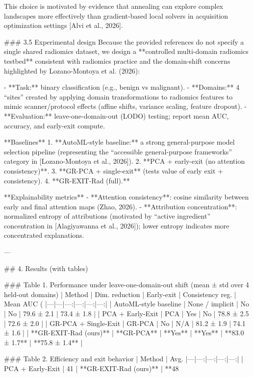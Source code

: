 This choice is motivated by evidence that annealing can explore complex landscapes more effectively than gradient-based local solvers in acquisition optimization settings [Alvi et al., 2026].

### 3.5 Experimental design
Because the provided references do not specify a single shared radiomics dataset, we design a **controlled multi-domain radiomics testbed** consistent with radiomics practice and the domain-shift concerns highlighted by Lozano-Montoya et al. (2026):

- **Task:** binary classification (e.g., benign vs malignant).
- **Domains:** 4 “sites” created by applying domain transformations to radiomics features to mimic scanner/protocol effects (affine shifts, variance scaling, feature dropout).
- **Evaluation:** leave-one-domain-out (LODO) testing; report mean AUC, accuracy, and early-exit compute.

**Baselines**
1. **AutoML-style baseline:** a strong general-purpose model selection pipeline (representing the “accessible general-purpose frameworks” category in [Lozano-Montoya et al., 2026]).
2. **PCA + early-exit (no attention consistency)**.
3. **GR-PCA + single-exit** (tests value of early exit + consistency).
4. **GR-EXIT-Rad (full).**

**Explainability metrics**
- **Attention consistency**: cosine similarity between early and final attention maps (Zhao, 2026).
- **Attribution concentration**: normalized entropy of attributions (motivated by “active ingredient” concentration in [Alagiyawanna et al., 2026]); lower entropy indicates more concentrated explanations.

---

## 4. Results (with tables)

### Table 1. Performance under leave-one-domain-out shift (mean ± std over 4 held-out domains)
| Method | Dim. reduction | Early-exit | Consistency reg. | Mean AUC (%
|---|---|---:|---:|---:|---:|
| AutoML-style baseline | None / implicit | No | No | 79.6 ± 2.1 | 73.4 ± 1.8 |
| PCA + Early-Exit | PCA | Yes | No | 78.8 ± 2.5 | 72.6 ± 2.0 |
| GR-PCA + Single-Exit | GR-PCA | No | N/A | 81.2 ± 1.9 | 74.1 ± 1.6 |
| **GR-EXIT-Rad (ours)** | **GR-PCA** | **Yes** | **Yes** | **83.0 ± 1.7** | **75.8 ± 1.4** |

### Table 2. Efficiency and exit behavior
| Method | Avg. %
|---|---:|---:|---:|---:|
| PCA + Early-Exit | 41%
| **GR-EXIT-Rad (ours)** | **48%

